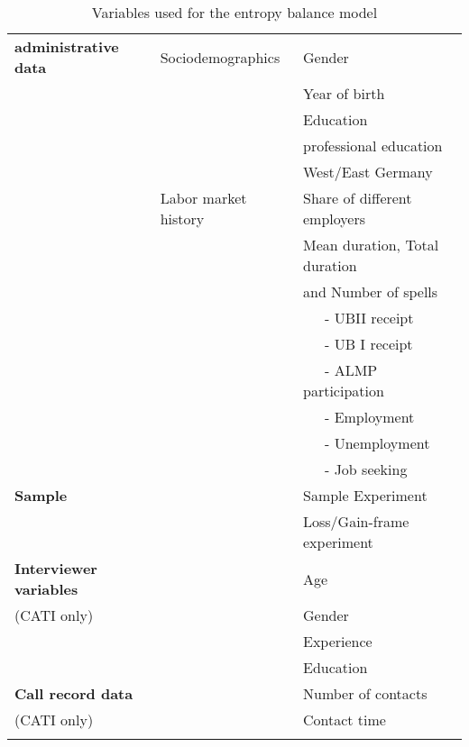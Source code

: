 \renewcommand{\arraystretch}{0.8}
\begin{table*}[h]
 \caption{ Variables used for the entropy balance model}\label{tab:covariates}
\begin{tabular}{lll}
  \addlinespace \toprule\addlinespace
\textbf{administrative data} &Sociodemographics &  Gender\\ \addlinespace
&							&Year of birth \\ \addlinespace
&							&Education\\ \addlinespace
&							&professional education\\ \addlinespace 
&							&West/East Germany\\ \addlinespace			
&Labor market history				& Share of different employers\\ \addlinespace 
&							& Mean duration, Total duration  \\
&							& and Number of spells \\ \addlinespace
&							&  \ \ \ - UBII receipt   \\ \addlinespace
&							&  \ \ \ - UB I receipt \\ \addlinespace
&							& \ \ \ - ALMP participation \\ \addlinespace
&							&\ \ \  - Employment\\ \addlinespace
&							& \ \ \ - Unemployment \\ \addlinespace
&							& \ \ \ - Job seeking \\ \addlinespace \addlinespace
 \midrule \addlinespace
\textbf{Sample}&						&Sample Experiment \\ \addlinespace
 &							&Loss/Gain-frame experiment \\ \addlinespace \addlinespace
 \midrule \addlinespace
\textbf{Interviewer variables}  &			&Age\\ \addlinespace
(CATI only)&							&Gender\\ \addlinespace
&							&Experience\\ \addlinespace
&							&Education\\ \addlinespace \addlinespace
 \midrule \addlinespace
\textbf{Call record data}	 &				& Number of contacts\\ \addlinespace
 (CATI only)&							& Contact time\\ \addlinespace
 \bottomrule
 \end{tabular}
\end{table*}